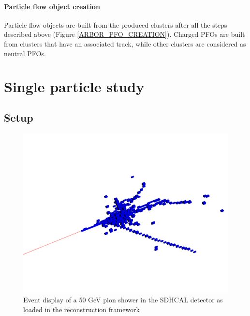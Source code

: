 \documentclass[cits]{JINST}
\begin{document}
\paragraph*{Particle flow object creation} Particle flow objects are built from the produced clusters after all the steps described above (Figure \ref{ARBOR_PFO_CREATION}). Charged PFOs are built from clusters that have an associated track, while other clusters are considered as neutral PFOs.

\newpage
\section{Single particle study}
\label{SINGLE_PARTICLE_STUDY_SECTION}

\subsection{Setup}

\begin{figure}
  \vspace{-20pt}
  \begin{center}
    \includegraphics[width=\linewidth]{SingleParticleSetup.pdf}
  \end{center}
  \vspace{-10pt}
  \caption{\label{ARBOR_SINGLE_PARTICLE_SETUP} Event display of a 50 GeV pion shower in the SDHCAL detector as loaded in the reconstruction framework}
\end{figure}
\end{document}

